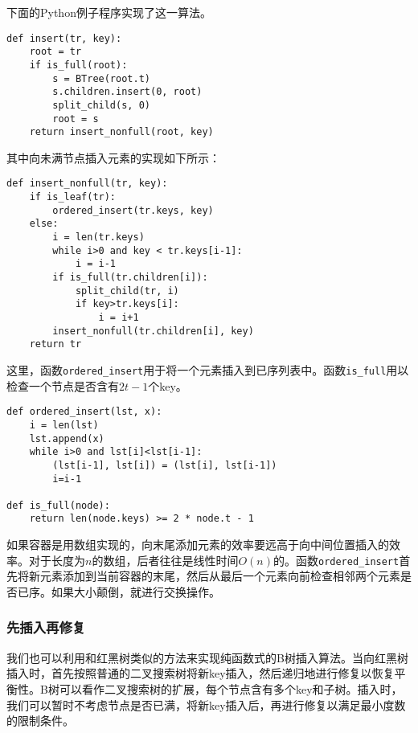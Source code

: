 \documentclass[UTF8]{article}
\begin{document}
下面的Python例子程序实现了这一算法。

\lstset{language=Python}
\begin{lstlisting}
def insert(tr, key):
    root = tr
    if is_full(root):
        s = BTree(root.t)
        s.children.insert(0, root)
        split_child(s, 0)
        root = s
    return insert_nonfull(root, key)
\end{lstlisting}

其中向未满节点插入元素的实现如下所示：

\begin{lstlisting}
def insert_nonfull(tr, key):
    if is_leaf(tr):
        ordered_insert(tr.keys, key)
    else:
        i = len(tr.keys)
        while i>0 and key < tr.keys[i-1]:
            i = i-1
        if is_full(tr.children[i]):
            split_child(tr, i)
            if key>tr.keys[i]:
                i = i+1
        insert_nonfull(tr.children[i], key)
    return tr
\end{lstlisting}

这里，函数\texttt{ordered\_insert}用于将一个元素插入到已序列表中。函数\texttt{is\_full}用以检查一个节点是否含有$2t-1$个key。

\begin{lstlisting}
def ordered_insert(lst, x):
    i = len(lst)
    lst.append(x)
    while i>0 and lst[i]<lst[i-1]:
        (lst[i-1], lst[i]) = (lst[i], lst[i-1])
        i=i-1

def is_full(node):
    return len(node.keys) >= 2 * node.t - 1
\end{lstlisting}

如果容器是用数组实现的，向末尾添加元素的效率要远高于向中间位置插入的效率。对于长度为$n$的数组，后者往往是线性时间$O(n)$的。函数\texttt{ordered\_insert}首先将新元素添加到当前容器的末尾，然后从最后一个元素向前检查相邻两个元素是否已序。如果大小颠倒，就进行交换操作。


\subsubsection{先插入再修复}

我们也可以利用和红黑树类似的方法来实现纯函数式的B树插入算法。当向红黑树插入时，首先按照普通的二叉搜索树将新key插入，然后递归地进行修复以恢复平衡性。B树可以看作二叉搜索树的扩展，每个节点含有多个key和子树。插入时，我们可以暂时不考虑节点是否已满，将新key插入后，再进行修复以满足最小度数的限制条件。
\end{document}
